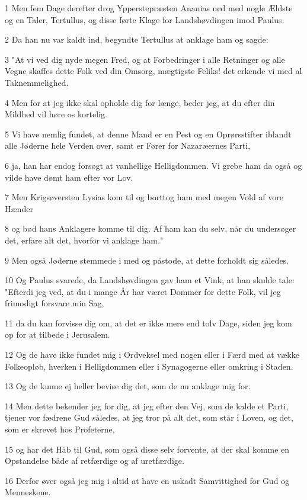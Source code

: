 \par 1 Men fem Dage derefter drog Ypperstepræsten Ananias ned med nogle Ældste og en Taler, Tertullus, og disse førte Klage for Landshøvdingen imod Paulus.
\par 2 Da han nu var kaldt ind, begyndte Tertullus at anklage ham og sagde:
\par 3 "At vi ved dig nyde megen Fred, og at Forbedringer i alle Retninger og alle Vegne skaffes dette Folk ved din Omsorg, mægtigste Feliks! det erkende vi med al Taknemmelighed.
\par 4 Men for at jeg ikke skal opholde dig for længe, beder jeg, at du efter din Mildhed vil høre os kortelig.
\par 5 Vi have nemlig fundet, at denne Mand er en Pest og en Oprørsstifter iblandt alle Jøderne hele Verden over, samt er Fører for Nazaræernes Parti,
\par 6 ja, han har endog forsøgt at vanhellige Helligdommen. Vi grebe ham da også og vilde have dømt ham efter vor Lov.
\par 7 Men Krigsøversten Lysias kom til og borttog ham med megen Vold af vore Hænder
\par 8 og bød hans Anklagere komme til dig. Af ham kan du selv, når du undersøger det, erfare alt det, hvorfor vi anklage ham."
\par 9 Men også Jøderne stemmede i med og påstode, at dette forholdt sig således.
\par 10 Og Paulus svarede, da Landshøvdingen gav ham et Vink, at han skulde tale: "Efterdi jeg ved, at du i mange År har været Dommer for dette Folk, vil jeg frimodigt forsvare min Sag,
\par 11 da du kan forvisse dig om, at det er ikke mere end tolv Dage, siden jeg kom op for at tilbede i Jerusalem.
\par 12 Og de have ikke fundet mig i Ordveksel med nogen eller i Færd med at vække Folkeopløb, hverken i Helligdommen eller i Synagogerne eller omkring i Staden.
\par 13 Og de kunne ej heller bevise dig det, som de nu anklage mig for.
\par 14 Men dette bekender jeg for dig, at jeg efter den Vej, som de kalde et Parti, tjener vor fædrene Gud således, at jeg tror på alt det, som står i Loven, og det, som er skrevet hos Profeterne,
\par 15 og har det Håb til Gud, som også disse selv forvente, at der skal komme en Opstandelse både af retfærdige og af uretfærdige.
\par 16 Derfor øver også jeg mig i altid at have en uskadt Samvittighed for Gud og Menneskene.
